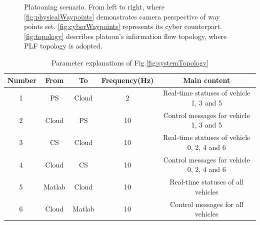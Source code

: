 \documentclass[conference]{IEEEtran}
\begin{document}
\begin{figure}[htbp]
	\begin{centering}
	\end{centering}
	\caption {Platooning scenario. From left to right, where \ref{fig:physicalWaypoints} demonstrates camera perspective of way points set. \ref{fig:cyberWaypoints} represents its cyber counterpart. \ref{fig:topology} describes platoon's information flow topology, where PLF topology\cite{ref:zhengyang} is adopted.}
\end{figure}
\begin{table}
	\centering
	\caption {Parameter explanations of Fig.\ref{fig:systemTopology} }
	\label {tab:matlab}
	\begin{tabular}{|c|c|c|c|c|}
	\hline
	\textbf{Number}&\textbf{From}&\textbf{To}&\textbf{Frequency(Hz)}&Main content \\ \hline
	\textcircled{1}&PS&Cloud&2&Real-time statuses of vehicle 1, 3 and 5  \\ \hline
	\textcircled{2}&Cloud&PS&10&Control messages for vehicle 1, 3 and 5   \\ \hline
	\textcircled{3}&CS&Cloud&10&Real-time statuses of vehicle 0, 2, 4 and 6   \\ \hline
	\textcircled{4}&Cloud&CS&10&Control messages for vehicle 0, 2, 4 and 6    \\ \hline	
	\textcircled{5}&Matlab&Cloud&10&Real-time statuses of all vehicles  \\ \hline
	\textcircled{6}&Cloud&Matlab&10&Control messages for all vehicles   \\ \hline				
	\end{tabular}
\end{table}
\end{document}
